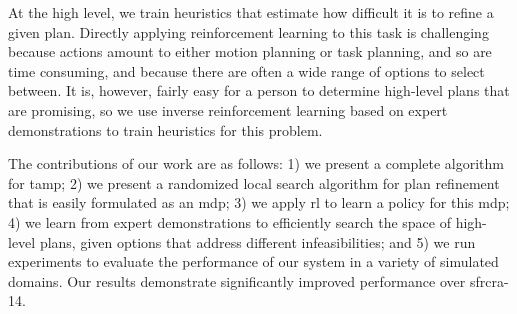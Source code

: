 At the high level, we train heuristics that estimate how difficult it
is to refine a given plan. Directly applying reinforcement learning to
this task is challenging because actions amount to either motion
planning or task planning, and so are time consuming, and because
there are often a wide range of options to select between. It is,
however, fairly easy for a person to determine high-level plans that
are promising, so we use inverse reinforcement learning based on
expert demonstrations to train heuristics for this problem.


The contributions of our work are as follows: 1) we present a complete
algorithm for {\sc tamp}; 2) we present a randomized local search
algorithm for plan refinement that is easily formulated as an {\sc
  mdp}; 3) we apply {\sc rl} to learn a policy for this {\sc mdp}; 4)
we learn from expert demonstrations to efficiently search the space of
high-level plans, given options that address different
infeasibilities; and 5) we run experiments to evaluate the performance
of our system in a variety of simulated domains. Our results
demonstrate significantly improved performance over {\sc sfrcra-14}.
